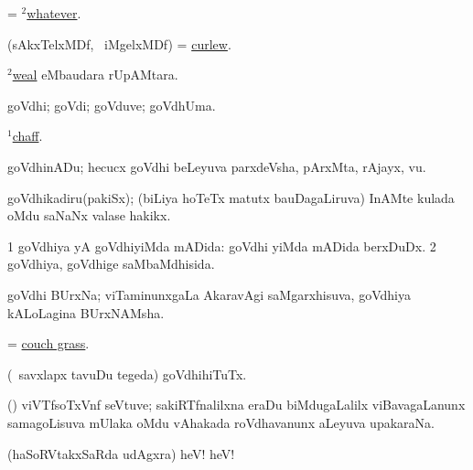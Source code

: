 \bentry
{} 
\expl{}
\bmng
= \hyperlink{whatever(2)}{$^2$whatever}. 
\emng
\eentry

\bentry
{} 
\gl{\nA}
\expl{}
\bmng
(sAkxTelxMDf, \kanu\ iMgelxMDf) = \hyperref{kandict_c.pdf}{C}{curlew}{curlew}. 
\emng
\eentry

\bentry
{} 
\gl{\nA}
\expl{}
\bmng
\hyperlink{weal(2)}{$^2$weal} eMbaudara rUpAMtara. 
\emng
\eentry

\bentry
{} 
\gl{\nA}
\expl{}
\bmng
goVdhi; goVdi; goVduve; goVdhUma. 
\emng

\noindent 
\gl{\pagu}
\expl{}
\bmng
{} \hyperref{kandict_c.pdf}{C}{chaff(1) nuga(1)}{$^1$chaff}. 
\emng
\eentry

\bentry 
{} 
\gl{\nA}
\expl{}
\bmng
goVdhinADu; hecucx goVdhi beLeyuva parxdeVsha, pArxMta, rAjayx, \mo vu. 
\emng
\eentry

\bentry
{} 
\gl{\nA}
\expl{}
\bmng
goVdhikadiru(pakiSx); (biLiya hoTeTx matutx bauDagaLiruva) InAMte  kulada oMdu saNaNx valase hakikx. 
\emng
\eentry

 
\bentry
{} 
\gl{\gu}
\expl{}
\bmng
\bnum
\num{1} goVdhiya yA goVdhiyiMda mADida:  goVdhi yiMda mADida berxDuDx. 
\num{2} goVdhiya, goVdhige saMbaMdhisida. 
\enum
\emng
\eentry

\bentry
{} 
\gl{\nA}
\expl{}
\bmng
goVdhi BUrxNa; viTaminunxgaLa AkaravAgi saMgarxhisuva, goVdhiya kALoLagina BUrxNAMsha. 
\emng
\eentry

\bentry
{} 
\gl{\nA}
\expl{}
\bmng
= \hyperref{kandict_c.pdf}{C}{couch grass}{couch grass}.
\emng
\eentry

\bentry
{} 
\gl{\nA}
\expl{}
\bmng
(\kanmu\ savxlapx tavuDu tegeda) goVdhihiTuTx. 
\emng
\eentry

\bentry
{} 
\gl{\nA}
\expl{}
\bmng
(\Bwvi) viVTfsoTxVnf seVtuve; sakiRTfnalilxna eraDu biMdugaLalilx viBavagaLanunx samagoLisuva mUlaka oMdu vAhakada roVdhavanunx aLeyuva upakaraNa. 
\emng
\eentry

\bentry
{} 
\gl{\BAavayx}
\expl{}
\bmng
(haSoRVtakxSaRda udAgxra) heV! heV! 
\emng
\eentry

